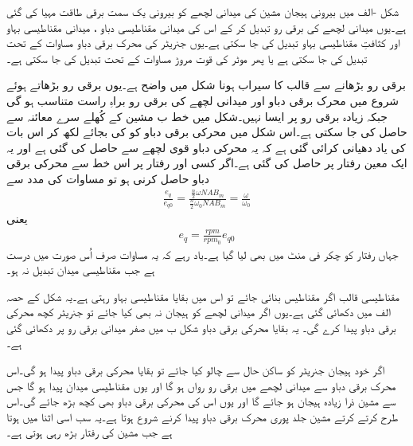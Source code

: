 شکل -الف میں بیرونی ہیجان مشین کی میدانی لچھے کو بیرونی یک سمت  برقی طاقت مہیا کی گئی ہے۔یوں میدانی لچھے کی برقی رو تبدیل کر کے اس کی میدانی مقناطیسی دباو  ، میدانی مقناطیسی بہاو   اور کثافتِ مقناطیسی بہاو   تبدیل کی جا سکتی ہے۔یوں جنریٹر کی محرک برقی دباو مساوات   کے تحت تبدیل کی جا سکتی ہے یا پھر موٹر کی قوت مروڑ مساوات   کے تحت تبدیل کی جا سکتی ہے۔

برقی رو بڑھانے سے قالب کا سیراب ہونا شکل   میں واضح ہے۔یوں برقی رو بڑھاتے ہوئے شروع میں محرک برقی دباو اور میدانی لچھے کی برقی رو براہِ راست متناسب ہو گی جبکہ زیادہ برقی رو پر ایسا نہیں۔شکل میں خط ب مشین کے کُھلے سرے معائنہ سے حاصل کی جا سکتی ہے۔اس شکل میں محرکی برقی دباو کو  کی بجائے   لکھ کر اس بات کی یاد دھیانی کرائی گئی ہے کہ یہ محرکی دباو  قوی لچھے سے حاصل کی گئی ہے اور یہ ایک معین رفتار  پر حاصل کی گئی ہے۔اگر کسی اور رفتار  پر اس خط سے محرکی برقی دباو  حاصل کرنی ہو تو مساوات   کی مدد سے
\begin{align}
\frac{e_q}{e_{q0}}=\frac{\frac{n}{2} \omega N A B_m}{\frac{n}{2} \omega_0 N A B_m}=\frac{\omega}{\omega_0}
\end{align}
یعنی
\begin{align}\label{مساوات_یکسمتی_چکر_بالمقابل_رفتار}
e_q=\frac{rpm}{rpm_0} e_{q0}
\end{align}
جہاں رفتار کو چکر فی منٹ میں بھی لیا گیا ہے۔یاد رہے کہ یہ مساوات صرف اُس صورت میں درست ہے جب مقناطیسی میدان تبدیل نہ ہو۔

مقناطیسی قالب اگر مقناطیس بنائی جائے تو اس میں بقایا مقناطیسی بہاو رہتی ہے۔یہ شکل کے حصہ الف میں دکھائی گئی ہے۔یوں اگر میدانی لچھے کو ہیجان نہ بھی کیا جائے تو جنریٹر کچھ محرکی برقی دباو پیدا کرے گی۔ یہ بقایا  محرکی برقی دباو شکل ب میں صفر میدانی برقی رو پر دکھائی گئی ہے۔

 اگر خود ہیجان جنریٹر کو ساکن حال سے چالو کیا جائے تو بقایا محرکی برقی دباو پیدا ہو گی۔اس محرک برقی دباو سے میدانی لچھے میں برقی رو رواں ہو گا اور یوں مقناطیسی میدان پیدا ہو گا جس سے مشین ذرا زیادہ ہیجان ہو جائے گا اور یوں اس کی محرکی برقی دباو بھی کچھ بڑھ جائے گی۔اس طرح کرتے کرتے مشین جلد پوری محرک برقی دباو پیدا کرنے شروع ہوتا ہے۔یہ سب اسی اثنا میں ہوتا ہے جب مشین کی رفتار بڑھ رہی ہوتی ہے۔

